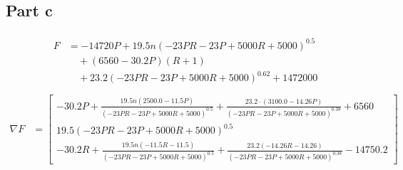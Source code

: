 \documentclass[a4paper,12pt]{article} %
\begin{document}
\subsection{Part c}
\begin{align*}
  \begin{split} 
F &= - 14720 P + 19.5 n \left(- 23 P R - 23 P + 5000 R + 5000\right)^{0.5}\\
  & \quad + \left(6560 - 30.2 P\right) \left(R + 1\right)\\
  & \quad  + 23.2 \left(- 23 P R - 23 P + 5000 R + 5000\right)^{0.62} + 1472000\\
  \end{split} 
\end{align*}
\begin{align*}
\nabla F &= \left[\begin{matrix}- 30.2 P + \frac{19.5 n \left(2500.0 - 11.5 P\right)}{\left(- 23 P R - 23 P + 5000 R + 5000\right)^{0.5}} + \frac{23.2 \cdot \left(3100.0 - 14.26 P\right)}{\left(- 23 P R - 23 P + 5000 R + 5000\right)^{0.38}} + 6560\\19.5 \left(- 23 P R - 23 P + 5000 R + 5000\right)^{0.5}\\- 30.2 R + \frac{19.5 n \left(- 11.5 R - 11.5\right)}{\left(- 23 P R - 23 P + 5000 R + 5000\right)^{0.5}} + \frac{23.2 \left(- 14.26 R - 14.26\right)}{\left(- 23 P R - 23 P + 5000 R + 5000\right)^{0.38}} - 14750.2\end{matrix}\right]\\

\end{align*}
\end{document}
